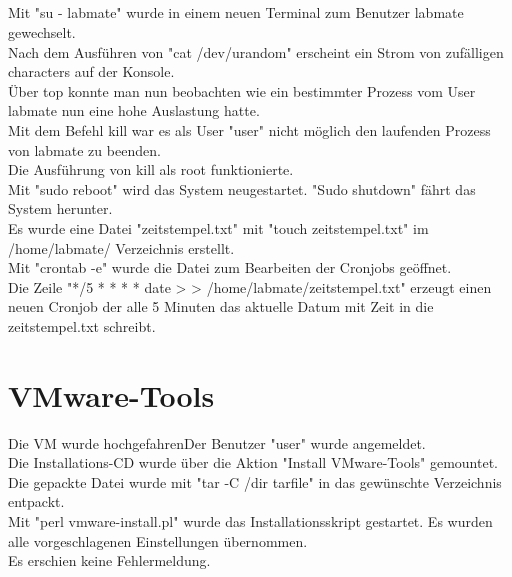 \documentclass[12pt]{article}
\theoremstyle{plain}
\begin{document}
\subsection{}
Mit "su - labmate" wurde in einem neuen Terminal zum Benutzer labmate gewechselt. \\
Nach dem Ausführen von "cat /dev/urandom" erscheint ein Strom von zufälligen characters auf der Konsole. \\
Über top konnte man nun beobachten wie ein bestimmter Prozess vom User labmate nun eine hohe Auslastung hatte. \\
Mit dem Befehl kill war es als User "user" nicht möglich den laufenden Prozess von labmate zu beenden. \\
Die Ausführung von kill als root funktionierte. \\
Mit "sudo reboot" wird das System neugestartet. "Sudo shutdown" fährt das System herunter.
\\
Es wurde eine Datei "zeitstempel.txt" mit "touch zeitstempel.txt" im /home/labmate/ Verzeichnis erstellt. \\
Mit "crontab -e" wurde die Datei zum Bearbeiten der Cronjobs geöffnet. \\
Die Zeile "*/5 * * * * date > > /home/labmate/zeitstempel.txt" erzeugt einen neuen Cronjob der alle 5 Minuten das aktuelle Datum mit Zeit in die zeitstempel.txt schreibt.

\section{VMware-Tools}
Die VM wurde hochgefahrenDer Benutzer "user" wurde angemeldet. \\
Die Installations-CD wurde über die Aktion "Install VMware-Tools" gemountet. \\
Die gepackte Datei wurde mit "tar -C /dir tarfile" in das gewünschte Verzeichnis entpackt. \\
Mit "perl vmware-install.pl" wurde das Installationsskript gestartet. Es wurden alle vorgeschlagenen Einstellungen übernommen. \\ Es erschien keine Fehlermeldung.
\end{document}

